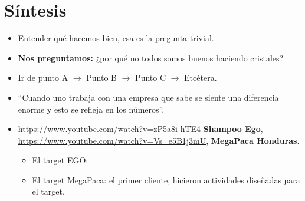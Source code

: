 \section{Síntesis}
\begin{itemize}
    \item Entender qué hacemos bien, esa es la pregunta trivial.
    \item \textbf{Nos preguntamos:} ¿por qué no todos somos buenos haciendo cristales?
    \item Ir de punto A $\rightarrow$ Punto B $\rightarrow$ Punto C $\rightarrow$ Etcétera.
    \item ``Cuando uno trabaja con una empresa que sabe se siente una diferencia enorme y esto se refleja en los números''.
    \item \url{https://www.youtube.com/watch?v=zP5a8i-hTE4} \textbf{Shampoo Ego}, \url{https://www.youtube.com/watch?v=Vs_e5B1j3mU}, \textbf{MegaPaca Honduras}.
        \begin{itemize}
            \item El target EGO: 
            \item El target MegaPaca: el primer cliente, hicieron actividades diseñadas para el target.
        \end{itemize}
\end{itemize}
